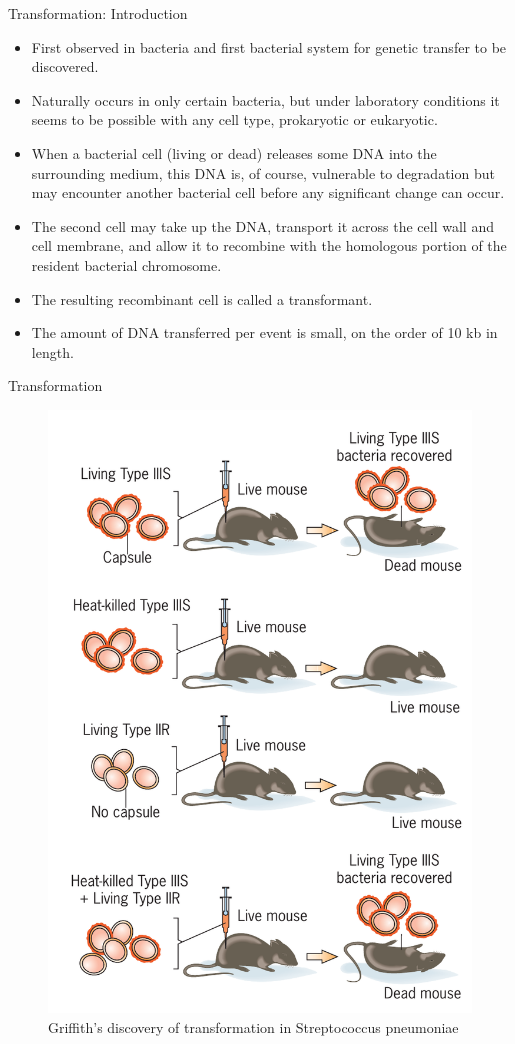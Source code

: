 \documentclass[
  ignorenonframetext,
  aspectratio=169]{beamer}
\providecommand{\tightlist}{%
  \setlength{\itemsep}{0pt}\setlength{\parskip}{0pt}}
\begin{document}
\begin{frame}{Transformation: Introduction}
\protect\hypertarget{transformation-introduction}{}
\begin{itemize}
\tightlist
\item
  First observed in bacteria and first bacterial system for genetic
  transfer to be discovered.
\item
  Naturally occurs in only certain bacteria, but under laboratory
  conditions it seems to be possible with any cell type, prokaryotic or
  eukaryotic.
\item
  When a bacterial cell (living or dead) releases some DNA into the
  surrounding medium, this DNA is, of course, vulnerable to degradation
  but may encounter another bacterial cell before any significant change
  can occur.
\item
  The second cell may take up the DNA, transport it across the cell wall
  and cell membrane, and allow it to recombine with the homologous
  portion of the resident bacterial chromosome.
\item
  The resulting recombinant cell is called a \alert{transformant}.
\item
  The amount of DNA transferred per event is small, on the order of 10
  kb in length.
\end{itemize}
\end{frame}

\begin{frame}{Transformation}
\protect\hypertarget{transformation}{}
\begin{figure}
\includegraphics[width=0.28\linewidth]{./../images/bacterial_transformation} \caption{Griffith's discovery of transformation in Streptococcus pneumoniae}\label{fig:transformation-griffith}
\end{figure}
\end{frame}
\end{document}
